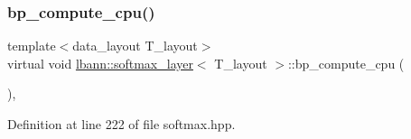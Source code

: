 \subsubsection{\texorpdfstring{bp\+\_\+compute\+\_\+cpu()}{bp\_compute\_cpu()}}
{\footnotesize\ttfamily template$<$data\+\_\+layout T\+\_\+layout$>$ \\
virtual void \hyperlink{classlbann_1_1softmax__layer}{lbann\+::softmax\+\_\+layer}$<$ T\+\_\+layout $>$\+::bp\+\_\+compute\+\_\+cpu (\begin{DoxyParamCaption}{ }\end{DoxyParamCaption})\hspace{0.3cm}{\ttfamily [inline]}, {\ttfamily [virtual]}}



Definition at line 222 of file softmax.\+hpp.


